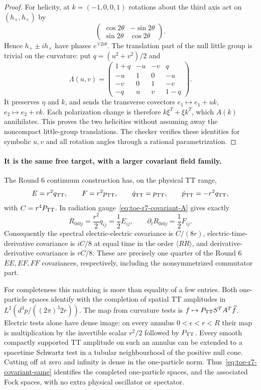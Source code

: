 \begin{proof}
For helicity, at $k=(-1,0,0,1)$ rotations about the third axis act on
$(h_+,h_\times)$ by
\[
 \begin{pmatrix}\cos2\theta&-\sin2\theta\\
                 \sin2\theta&\cos2\theta\end{pmatrix}.
\]
Hence $h_+\pm i h_\times$ have phases $e^{\mp2i\theta}$.
The translation part of the null little group is trivial on the curvature:
put $q=(u^2+v^2)/2$ and
\[
 \Lambda(u,v)=
 \begin{pmatrix}
 1+q&-u&-v&q\\
 -u&1&0&-u\\
 -v&0&1&-v\\
 -q&u&v&1-q
 \end{pmatrix}.
\]
It preserves $\eta$ and $k$, and sends the transverse covectors
$e_1\mapsto e_1+u k$, $e_2\mapsto e_2+v k$. Each polarization change is
therefore $k\xi^T+\xi k^T$, which $A(k)$ annihilates.
This proves the two helicities without assuming away the noncompact
little-group translations. The checker verifies these identities for
symbolic $u,v$ and all rotation angles through a rational parametrization.
\end{proof}

\paragraph{It is the same free target, with a larger covariant field family.}
The Round 6 continuum construction has, on the physical TT range,
\[
 E=r^2q_{\mathrm{TT}},\qquad F=r^2p_{\mathrm{TT}},\qquad
 \dot q_{\mathrm{TT}}=p_{\mathrm{TT}},\qquad\dot p_{\mathrm{TT}}=-r^2q_{\mathrm{TT}},
\]
with $C=r^4P_{\mathrm{TT}}$. In radiation gauge~\eqref{eq:toe-r7-covariant-A} gives exactly
\begin{equation}
 R_{0i0j}=\frac{r^2}{2}q_{ij}=\frac12E_{ij},
 \qquad\partial_tR_{0i0j}=\frac12F_{ij}.
 \label{eq:toe-r7-covariant-same}
\end{equation}
Consequently the spectral electric-electric covariance is
$C/(8r)$, electric-time-derivative covariance is $iC/8$ at equal time
in the order $\langle R\dot R\rangle$, and derivative-derivative covariance
is $rC/8$. These are precisely one quarter of the Round 6 $EE,EF,FF$
covariances, respectively, including the nonsymmetrized commutator part.

For completeness this matching is more than equality of a few entries.
Both one-particle spaces identify with the completion of spatial TT
amplitudes in $L^2(d^3p/((2\pi)^3 2r))$. The map from curvature tests is
$f\mapsto P_{\mathrm{TT}} S^TA^T\widehat f$. Electric tests alone have dense image:
on every annulus $0<\epsilon<r<R$ their map is multiplication by the
invertible scalar $r^2/2$ followed by $P_{\mathrm{TT}}$. Every smooth compactly
supported TT amplitude on such an annulus can be extended to a spacetime
Schwartz test in a tubular neighbourhood of the positive null cone.
Cutting off at zero and infinity is dense in the one-particle norm.
Thus~\eqref{eq:toe-r7-covariant-same} identifies the completed one-particle spaces, and
the associated Fock spaces, with no extra physical oscillator or spectator.

